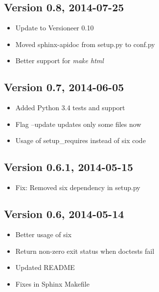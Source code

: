 \documentclass[letterpaper,10pt,english]{sphinxmanual}
\begin{document}
\subsection{Version 0.8, 2014-07-25}
\label{changes:version-0-8-2014-07-25}\begin{itemize}
\item {} 
Update to Versioneer 0.10

\item {} 
Moved sphinx-apidoc from setup.py to conf.py

\item {} 
Better support for \emph{make html}

\end{itemize}


\subsection{Version 0.7, 2014-06-05}
\label{changes:version-0-7-2014-06-05}\begin{itemize}
\item {} 
Added Python 3.4 tests and support

\item {} 
Flag --update updates only some files now

\item {} 
Usage of setup\_requires instead of six code

\end{itemize}


\subsection{Version 0.6.1, 2014-05-15}
\label{changes:version-0-6-1-2014-05-15}\begin{itemize}
\item {} 
Fix: Removed six dependency in setup.py

\end{itemize}


\subsection{Version 0.6, 2014-05-14}
\label{changes:version-0-6-2014-05-14}\begin{itemize}
\item {} 
Better usage of six

\item {} 
Return non-zero exit status when doctests fail

\item {} 
Updated README

\item {} 
Fixes in Sphinx Makefile

\end{itemize}
\end{document}
